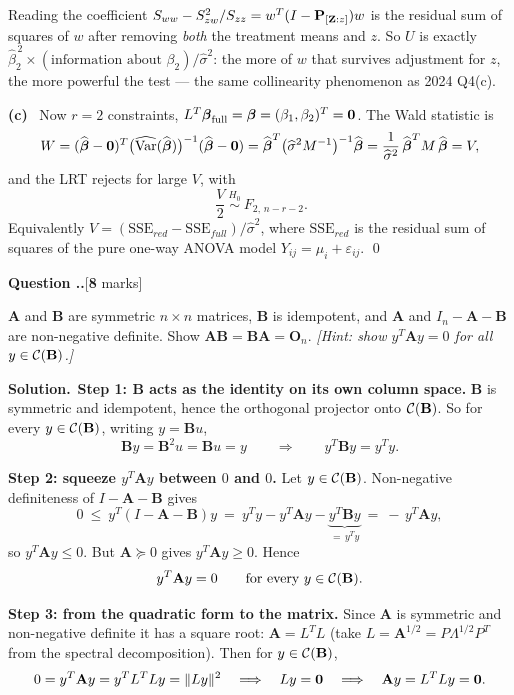 \documentclass[11pt]{article}
\newcommand{\wh}[1]{\widehat{#1}}
\newcommand{\Pj}{\mathbf{P}}
\newcommand{\SSE}{\mathrm{SSE}}
\newcounter{qq}[section]
\newcommand{\qhead}[2]{\medskip\refstepcounter{qq}%
  \noindent\textbf{\color{Blue}Question \thesection.\theqq.}\hfill\textnormal{[\textbf{#1} marks]}%
  \ifx\relax#2\relax\else\par\smallskip\fi}
\newcommand{\sol}{\smallskip\noindent\textbf{\color{ForestGreen}Solution.}\ }
\newcommand{\pt}[1]{\smallskip\noindent\textbf{(#1)}\ }
\begin{document}
\begin{idea}{Reading the coefficient}
$S_{ww}-S_{zw}^2/S_{zz}=w^T(I-\Pj_{[\bZ:z]})w$ is the residual sum of squares of $w$ after
removing \emph{both} the treatment means and $z$. So $U$ is exactly
$\wh\beta_2^{\,2}\times(\text{information about }\beta_2)/\wh\sigma^2$: the more of $w$ that
survives adjustment for $z$, the more powerful the test --- the same collinearity phenomenon
as 2024 Q4(c).
\end{idea}

\pt{c} Now $r=2$ constraints, $L^T\boldsymbol{\beta}_{\text{full}}=\boldsymbol{\beta}=(\beta_1,\beta_2)^T=\mathbf{0}$. The Wald
statistic is
\[
  W=(\wh\bb-\zero)^T\big(\widehat{\Var}(\wh\bb)\big)^{-1}(\wh\bb-\zero)
   =\wh\bb^T\big(\wh\sigma^2M^{-1}\big)^{-1}\wh\bb
   =\frac{1}{\wh\sigma^2}\,\wh\bb^TM\,\wh\bb=V,
\]
and the LRT rejects for large $V$, with
\[
  \boxed{\ \frac{V}{2}\ \overset{H_0}{\sim}\ F_{2,\,n-r-2}. }
\]
Equivalently $V=(\SSE_{red}-\SSE_{full})/\wh\sigma^2$, where $\SSE_{red}$ is the residual sum
of squares of the pure one-way ANOVA model $Y_{ij}=\mu_i+\varepsilon_{ij}$. \qed

\qhead{8}{}
\begin{stmt}
$\mathbf{A}$ and $\mathbf{B}$ are symmetric $n\times n$ matrices, $\mathbf{B}$ is idempotent,
and $\mathbf{A}$ and $I_n-\mathbf{A}-\mathbf{B}$ are non-negative definite. Show
$\mathbf{AB}=\mathbf{BA}=\mathbf{O}_n$.
\emph{[Hint: show $y^T\mathbf{A}y=0$ for all $y\in\mathcal{C}(\mathbf{B})$.]}
\end{stmt}

\sol \textbf{Step 1: $\mathbf{B}$ acts as the identity on its own column space.}
$\mathbf{B}$ is symmetric and idempotent, hence the orthogonal projector onto
$\mathcal{C}(\mathbf{B})$. So for every $y\in\mathcal{C}(\mathbf{B})$, writing $y=\mathbf{B}u$,
\[
  \mathbf{B}y=\mathbf{B}^2u=\mathbf{B}u=y
  \qquad\Longrightarrow\qquad y^T\mathbf{B}y=y^Ty .
\]

\textbf{Step 2: squeeze $y^T\mathbf{A}y$ between $0$ and $0$.} Let $y\in\mathcal{C}(\mathbf{B})$.
Non-negative definiteness of $I-\mathbf{A}-\mathbf{B}$ gives
\[
  0\ \le\ y^T(I-\mathbf{A}-\mathbf{B})y
   \ =\ y^Ty-y^T\mathbf{A}y-\underbrace{y^T\mathbf{B}y}_{=\,y^Ty}
   \ =\ -\,y^T\mathbf{A}y,
\]
so $y^T\mathbf{A}y\le0$. But $\mathbf{A}\succeq0$ gives $y^T\mathbf{A}y\ge0$. Hence
\[
  y^T\mathbf{A}y=0\qquad\text{for every } y\in\mathcal{C}(\mathbf{B}).
\]

\textbf{Step 3: from the quadratic form to the matrix.} Since $\mathbf{A}$ is symmetric and
non-negative definite it has a square root: $\mathbf{A}=L^TL$ (take
$L=\mathbf{A}^{1/2}=P\Lambda^{1/2}P^T$ from the spectral decomposition). Then for
$y\in\mathcal{C}(\mathbf{B})$,
\[
  0=y^T\mathbf{A}y=y^TL^TLy=\|Ly\|^2
  \quad\Longrightarrow\quad Ly=\mathbf{0}
  \quad\Longrightarrow\quad \mathbf{A}y=L^TLy=\mathbf{0} .
\]
\end{document}
